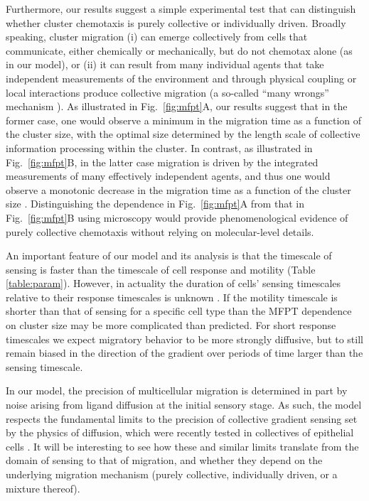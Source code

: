 Furthermore, our results suggest a simple experimental test that can distinguish whether cluster chemotaxis is purely collective or individually driven. Broadly speaking, cluster migration (i) can emerge collectively from cells that communicate, either chemically or mechanically, but do not chemotax alone (as in our model), or (ii) it can result from many individual agents that take independent measurements of the environment and through physical coupling or local interactions produce collective migration \cite{coburn2013tactile,vicsek1995novel} (a so-called ``many wrongs'' mechanism \cite{simons2004many}). As illustrated in Fig.\ \ref{fig:mfpt}A, our results suggest that in the former case, one would observe a minimum in the migration time as a function of the cluster size, with the optimal size determined by the length scale of collective information processing within the cluster. In contrast, as illustrated in Fig.\ \ref{fig:mfpt}B, in the latter case migration is driven by the integrated measurements of many effectively independent agents, and thus one would observe a monotonic decrease in the migration time as a function of the cluster size \cite{simons2004many}. Distinguishing the dependence in Fig.\ \ref{fig:mfpt}A from that in Fig.\ \ref{fig:mfpt}B using microscopy would provide phenomenological evidence of purely collective chemotaxis without relying on molecular-level details.

An important feature of our model and its analysis is that the timescale of sensing is faster than the timescale of cell response and motility (Table \ref{table:param}). However, in actuality the duration of cells' sensing timescales relative to their response timescales is unknown \cite{ellison2016cell}. If the motility timescale is shorter than that of sensing for a specific cell type than the MFPT dependence on cluster size may be more complicated than predicted. For short response timescales we expect migratory behavior to be more strongly diffusive, but to still remain biased in the direction of the gradient over periods of time larger than the sensing timescale.

In our model, the precision of multicellular migration is determined in part by noise arising from ligand diffusion at the initial sensory stage. As such, the model respects the fundamental limits to the precision of collective gradient sensing set by the physics of diffusion, which were recently tested in collectives of epithelial cells \cite{ellison2016cell, mugler2016limits}. It will be interesting to see how these and similar limits translate from the domain of sensing to that of migration, and whether they depend on the underlying migration mechanism (purely collective, individually driven, or a mixture thereof).
